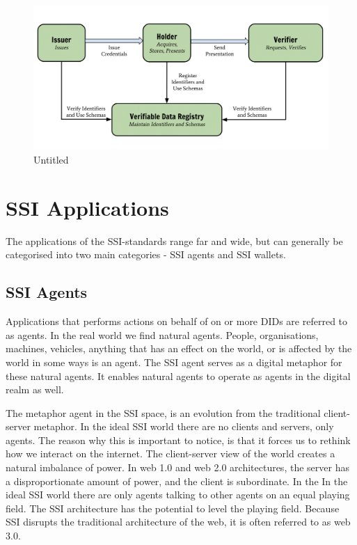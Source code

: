 \begin{figure}
\centering
\includegraphics{Introduction 99c57a51162f4f85bc7ec35261236693/Untitled.png}
\caption{Untitled}
\end{figure}

\hypertarget{ssi-applications}{%
\section{SSI Applications}\label{ssi-applications}}

The applications of the SSI-standards range far and wide, but can
generally be categorised into two main categories - SSI agents and SSI
wallets.

\hypertarget{ssi-agents}{%
\subsection{SSI Agents}\label{ssi-agents}}

Applications that performs actions on behalf of on or more DIDs are
referred to as agents. In the real world we find natural agents. People,
organisations, machines, vehicles, anything that has an effect on the
world, or is affected by the world in some ways is an agent. The SSI
agent serves as a digital metaphor for these natural agents. It enables
natural agents to operate as agents in the digital realm as well.

The metaphor agent in the SSI space, is an evolution from the
traditional client-server metaphor. In the ideal SSI world there are no
clients and servers, only agents. The reason why this is important to
notice, is that it forces us to rethink how we interact on the internet.
The client-server view of the world creates a natural imbalance of
power. In web 1.0 and web 2.0 architectures, the server has a
disproportionate amount of power, and the client is subordinate. In the
In the ideal SSI world there are only agents talking to other agents on
an equal playing field. The SSI architecture has the potential to level
the playing field. Because SSI disrupts the traditional architecture of
the web, it is often referred to as web 3.0.

